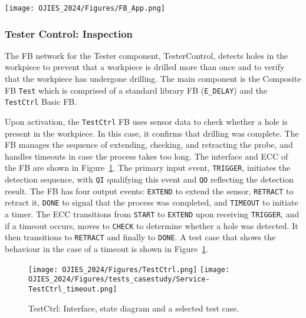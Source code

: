  \begin{figure*}[bt]
	\centering
		\texttt{[image: OJIES\_2024/Figures/FB\_App.png]}
		\caption{Control applications for the three substations including input FBs for processing signals from the physical system, control blocks orchestrating the station, and output FBs for writing information to actuators.}
		\label{fig:Application}	
 \end{figure*}

\subsubsection{Tester Control: Inspection}
The FB network for the Tester component, TesterControl, detects holes in the workpiece to prevent that a workpiece is drilled more than once and to verify that the workpiece has undergone drilling. The main component is the Composite FB \texttt{Test} which is comprised of a standard library FB (\texttt{E\_DELAY}) and the \texttt{TestCtrl} Basic FB. 

Upon activation, the \texttt{TestCtrl} FB uses sensor data to check whether a hole is present in the workpiece. In this case, it confirms that drilling was complete. The FB manages the sequence of extending, checking, and retracting the probe, and handles timeouts in case the process takes too long. The interface and ECC of the FB are shown in Figure~\ref{fig:TestCtrl}. 
The primary input event, \texttt{TRIGGER}, initiates the detection sequence, with \texttt{QI} qualifying this event and \texttt{QO} reflecting the detection result. The FB has four output events: \texttt{EXTEND} to extend the sensor, \texttt{RETRACT} to retract it, \texttt{DONE} to signal that the process was completed, and \texttt{TIMEOUT} to initiate a timer. The ECC transitions from \texttt{START} to \texttt{EXTEND} upon receiving \texttt{TRIGGER}, and if a timeout occurs, moves to \texttt{CHECK} to determine whether a hole was detected. It then transitions to \texttt{RETRACT} and finally to \texttt{DONE}. A test case that shows the behaviour in the case of a timeout is shown in Figure~\ref{fig:TestCtrl}. 
\begin{figure}[h!]
	\centering
		\texttt{[image: OJIES\_2024/Figures/TestCtrl.png]}
            \texttt{[image: OJIES\_2024/Figures/tests\_casestudy/Service-TestCtrl\_timeout.png]}
		\caption{TestCtrl: Interface, state diagram and a selected test case.}
		\label{fig:TestCtrl}	
 \end{figure}
 
